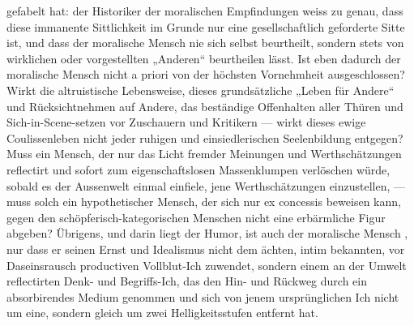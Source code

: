 gefabelt hat: der Historiker der moralischen Empfindungen weiss zu genau, dass diese immanente Sittlichkeit im Grunde nur eine gesellschaftlich geforderte Sitte ist, und dass der moralische Mensch nie sich selbst beurtheilt, sondern stets von wirklichen oder vorgestellten „Anderen“ beurtheilen lässt. Ist eben dadurch der moralische Mensch nicht a priori von der höchsten Vornehmheit ausgeschlossen? Wirkt die altruistische Lebensweise, dieses grundsätzliche „Leben für Andere“ und Rücksichtnehmen auf Andere, das beständige Offenhalten aller Thüren und Sich-in-Scene-setzen vor Zuschauern und Kritikern — wirkt dieses ewige Coulissenleben nicht jeder ruhigen und einsiedlerischen Seelenbildung entgegen? Muss ein Mensch, der nur das Licht fremder Meinungen und Werthschätzungen reflectirt und sofort zum eigenschaftslosen Massenklumpen verlöschen würde, sobald es der Aussenwelt einmal einfiele, jene Werthschätzungen einzustellen, — muss solch ein hypothetischer Mensch, der sich nur ex concessis beweisen kann, gegen den schöpferisch-kategorischen Menschen nicht eine erbärmliche Figur abgeben? Übrigens, und darin liegt der Humor, ist auch der moralische Mensch , nur dass er seinen Ernst und Idealismus nicht dem ächten, intim bekannten, vor Daseinsrausch productiven Vollblut-Ich zuwendet, sondern einem an der Umwelt reflectirten Denk- und Begriffs-Ich, das den Hin- und Rückweg durch ein absorbirendes Medium genommen und sich von jenem ursprünglichen Ich nicht um eine, sondern gleich um zwei Helligkeitsstufen entfernt hat.
\par

